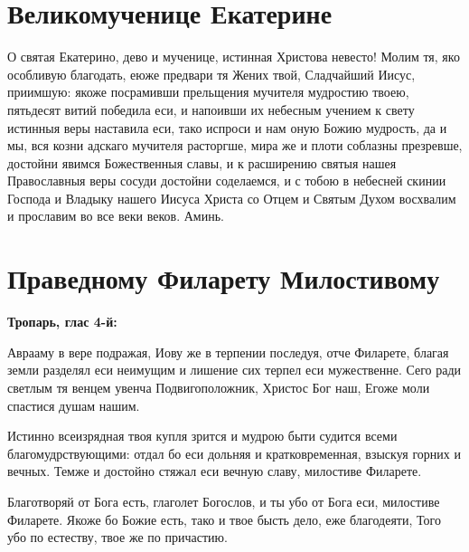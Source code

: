 \newpage{}\section{Великомученице Екатерине}
 


О святая Екатерино, дево и мученице, истинная Христова невесто! Молим тя, яко особливую благодать, еюже предвари тя Жених твой, Сладчайший Иисус, приимшую: якоже посрамивши прельщения мучителя мудростию твоею, пятьдесят витий победила еси, и напоивши их небесным учением к свету истинныя веры наставила еси, тако испроси и нам оную Божию мудрость, да и мы, вся козни адскаго мучителя расторгше, мира же и плоти соблазны презревше, достойни явимся Божественныя славы, и к расширению святыя нашея Православныя веры сосуди достойни соделаемся, и с тобою в небесней скинии Господа и Владыку нашего Иисуса Христа со Отцем и Святым Духом восхвалим и прославим во все веки веков. Аминь.

 





\section{Праведному Филарету Милостивому}
 
\bfseries Тропарь, глас 4-й:\normalfont{}


Аврааму в вере подражая, Иову же в терпении последуя, отче Филарете, благая земли разделял еси неимущим и лишение сих терпел еси мужественне. Сего ради светлым тя венцем увенча Подвигоположник, Христос Бог наш, Егоже моли спастися душам нашим.



Истинно всеизрядная твоя купля зрится и мудрою быти судится всеми благомудрствующими: отдал бо еси дольняя и кратковременная, взыскуя горних и вечных. Темже и достойно стяжал еси вечную славу, милостиве Филарете.




Благотворяй от Бога есть, глаголет Богослов, и ты убо от Бога еси, милостиве Филарете. Якоже бо Божие есть, тако и твое бысть дело, еже благодеяти, Того убо по естеству, твое же по причастию.

 



